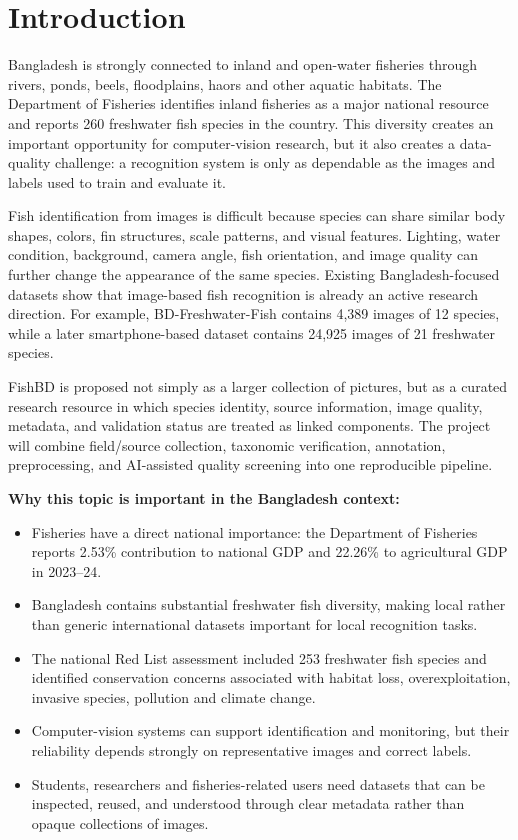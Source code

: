 \documentclass[12pt,a4paper]{article}
\begin{document}

\setcounter{page}{1}
\tableofcontents
\newpage

\section{Introduction}

Bangladesh is strongly connected to inland and open-water fisheries through rivers, ponds, beels, floodplains, haors and other aquatic habitats. The Department of Fisheries identifies inland fisheries as a major national resource and reports 260 freshwater fish species in the country. This diversity creates an important opportunity for computer-vision research, but it also creates a data-quality challenge: a recognition system is only as dependable as the images and labels used to train and evaluate it.

Fish identification from images is difficult because species can share similar body shapes, colors, fin structures, scale patterns, and visual features. Lighting, water condition, background, camera angle, fish orientation, and image quality can further change the appearance of the same species. Existing Bangladesh-focused datasets show that image-based fish recognition is already an active research direction. For example, BD-Freshwater-Fish contains 4,389 images of 12 species, while a later smartphone-based dataset contains 24,925 images of 21 freshwater species.

FishBD is proposed not simply as a larger collection of pictures, but as a curated research resource in which species identity, source information, image quality, metadata, and validation status are treated as linked components. The project will combine field/source collection, taxonomic verification, annotation, preprocessing, and AI-assisted quality screening into one reproducible pipeline.

\textbf{Why this topic is important in the Bangladesh context:}
\begin{itemize}
    \item Fisheries have a direct national importance: the Department of Fisheries reports 2.53\% contribution to national GDP and 22.26\% to agricultural GDP in 2023--24.
    \item Bangladesh contains substantial freshwater fish diversity, making local rather than generic international datasets important for local recognition tasks.
    \item The national Red List assessment included 253 freshwater fish species and identified conservation concerns associated with habitat loss, overexploitation, invasive species, pollution and climate change.
    \item Computer-vision systems can support identification and monitoring, but their reliability depends strongly on representative images and correct labels.
    \item Students, researchers and fisheries-related users need datasets that can be inspected, reused, and understood through clear metadata rather than opaque collections of images.
\end{itemize}
\end{document}
